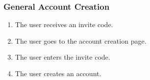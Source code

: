 \subsubsection{General Account Creation}

\begin{enumerate}
    \item The user receives an invite code.
    \item The user goes to the account creation page.
    \item The user enters the invite code.
    \item The user creates an account.
\end{enumerate}

